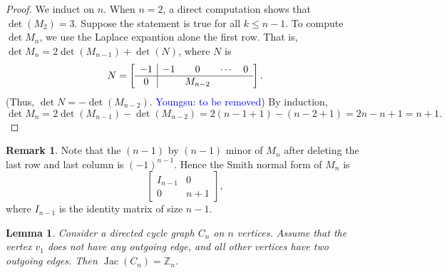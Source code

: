 \documentclass[11pt,reqno]{amsart}
\DeclareMathOperator{\Jac}{Jac}
\newcommand{\youngsu}[1]{{\textcolor{blue}{Youngsu: #1}}}
\theoremstyle{definition}
\newtheorem{rmk}[mydef]{Remark}
\theoremstyle{plain}
\newtheorem{lemma}[mydef]{Lemma}
\begin{document}
		\begin{proof}
			We induct on $n$. 
			When $n=2$, a direct computation shows that $\det(M_2) = 3$. 
			Suppose the statement is true for all $k \le n-1$. 
			To compute $\det M_n$, 
			we use the Laplace expantion alone the first row.
			That is, $\det M_n = 2 \det (M_{n-1}) + \det(N)$, where $N$ is
			\begin{equation}
			N = \left[ \begin{array}{c|c c c c c  }
				-1 &  -1& 0 & \cdots & 0 \\
				\hline 
				0 &  &  M_{n-2}
			\end{array} \right].
			\end{equation}
			(Thus, $\det N = - \det (M_{n-2})$. \youngsu{to be removed})
			By induction, $\det M_n = 2 \det (M_{n-1}) - \det(M_{n-2}) = 2 (n-1+1) - (n-2+1) = 2n - n + 1 = n + 1.$
		\end{proof}
		
		\begin{rmk}
			Note that the $(n-1)$ by $(n-1)$ minor of $M_n$ after deleting the last row and last column is $(-1)^{n-1}$. 
			Hence the Smith normal form of $M_n$ is 
			\begin{equation}
			\left[ \begin{array}{c|c}
				I_{n-1} & 0 \\
				\hline 
				0 & n+1 
			\end{array} \right],
			\end{equation}
			where $I_{n-1}$ is the identity matrix of size $n-1$. 
		\end{rmk}
		
		\begin{lemma} Consider a directed cycle graph $C_n$ on $n$ vertices. 
		Assume that the vertex $v_1$ does not have any outgoing edge, and all other vertices have two outgoing edges. 
		Then $\Jac (C_n) = \mathbb{Z}_n$.
		\end{lemma}
\end{document}
